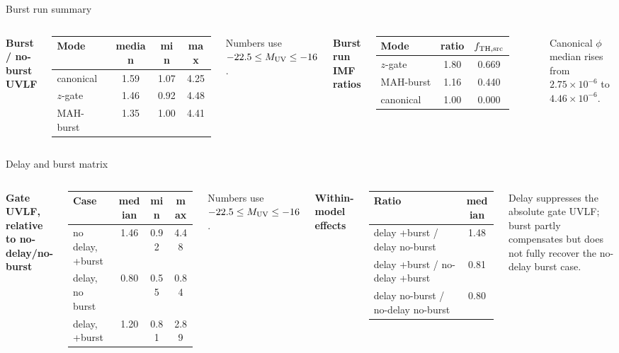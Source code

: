 \documentclass[aspectratio=169,10pt]{beamer}
\begin{document}
\begin{frame}{Burst run summary}
\begin{columns}[T]
\textbf{Burst / no-burst UVLF}
\begin{tabular}{lccc}
\toprule
Mode & median & min & max\\
\midrule
canonical & 1.59 & 1.07 & 4.25\\
$z$-gate & 1.46 & 0.92 & 4.48\\
MAH-burst & 1.35 & 1.00 & 4.41\\
\bottomrule
\end{tabular}

\vspace{2mm}
\small Numbers use $-22.5\le M_{\rm UV}\le -16$.

\textbf{Burst run IMF ratios}
\begin{tabular}{lcc}
\toprule
Mode & ratio & $f_{\rm TH,src}$\\
\midrule
$z$-gate & 1.80 & 0.669\\
MAH-burst & 1.16 & 0.440\\
canonical & 1.00 & 0.000\\
\bottomrule
\end{tabular}

\vspace{2mm}
\small Canonical $\phi$ median rises from $2.75\times10^{-6}$ to
$4.46\times10^{-6}$.
\end{columns}
\end{frame}

\begin{frame}{Delay and burst matrix}
\begin{columns}[T]
\textbf{Gate UVLF, relative to no-delay/no-burst}
\begin{tabular}{lccc}
\toprule
Case & median & min & max\\
\midrule
no delay, +burst & 1.46 & 0.92 & 4.48\\
delay, no burst & 0.80 & 0.55 & 0.84\\
delay, +burst & 1.20 & 0.81 & 2.89\\
\bottomrule
\end{tabular}

\vspace{2mm}
\small Numbers use $-22.5\le M_{\rm UV}\le -16$.

\textbf{Within-model effects}
\begin{tabular}{lc}
\toprule
Ratio & median\\
\midrule
delay +burst / delay no-burst & 1.48\\
delay +burst / no-delay +burst & 0.81\\
delay no-burst / no-delay no-burst & 0.80\\
\bottomrule
\end{tabular}

\vspace{2mm}
\small Delay suppresses the absolute gate UVLF; burst partly compensates but does not fully recover the no-delay burst case.
\end{columns}
\end{frame}
\end{document}
